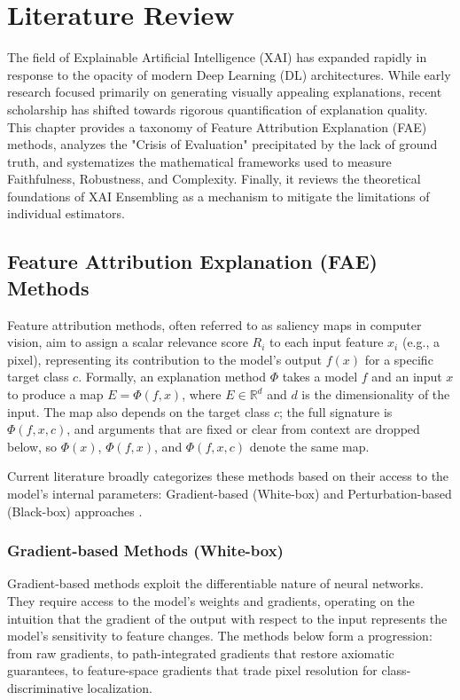 \chapter{Literature Review}
\label{ch:sota}

The field of Explainable Artificial Intelligence (XAI) has expanded rapidly in response to the opacity of modern Deep Learning (DL) architectures. While early research focused primarily on generating visually appealing explanations, recent scholarship has shifted towards rigorous quantification of explanation quality. This chapter provides a taxonomy of Feature Attribution Explanation (FAE) methods, analyzes the "Crisis of Evaluation" precipitated by the lack of ground truth, and systematizes the mathematical frameworks used to measure Faithfulness, Robustness, and Complexity. Finally, it reviews the theoretical foundations of XAI Ensembling as a mechanism to mitigate the limitations of individual estimators.

\section{Feature Attribution Explanation (FAE) Methods}

Feature attribution methods, often referred to as saliency maps in computer vision, aim to assign a scalar relevance score $R_i$ to each input feature $x_i$ (e.g., a pixel), representing its contribution to the model's output $f(x)$ for a specific target class $c$. Formally, an explanation method $\Phi$ takes a model $f$ and an input $x$ to produce a map $E = \Phi(f, x)$, where $E \in \mathbb{R}^{d}$ and $d$ is the dimensionality of the input. The map also depends on the target class $c$; the full signature is $\Phi(f, x, c)$, and arguments that are fixed or clear from context are dropped below, so $\Phi(x)$, $\Phi(f, x)$, and $\Phi(f, x, c)$ denote the same map.

Current literature broadly categorizes these methods based on their access to the model's internal parameters: Gradient-based (White-box) and Perturbation-based (Black-box) approaches \cite{hedstrom2023quantus}.


\subsection{Gradient-based Methods (White-box)}
Gradient-based methods exploit the differentiable nature of neural networks. They require access to the model's weights and gradients, operating on the intuition that the gradient of the output with respect to the input represents the model's sensitivity to feature changes. The methods below form a progression: from raw gradients, to path-integrated gradients that restore axiomatic guarantees, to feature-space gradients that trade pixel resolution for class-discriminative localization.

